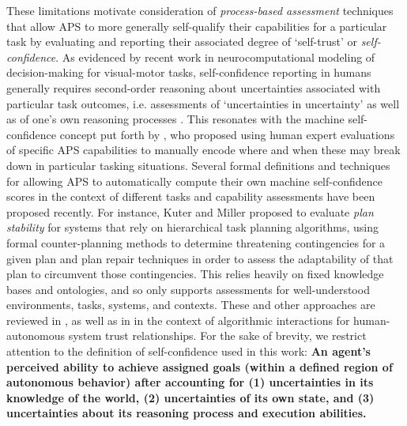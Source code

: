 These limitations motivate consideration of \emph{process-based assessment} techniques that allow APS to more generally self-qualify their capabilities for a particular task by evaluating and reporting their associated degree of `self-trust' or \emph{self-confidence}. 
As evidenced by recent work in neurocomputational modeling of decision-making for visual-motor tasks,
self-confidence reporting in humans generally requires second-order reasoning about uncertainties associated with particular task outcomes, i.e. assessments of `uncertainties in uncertainty' as well as of one's own reasoning processes \cite{Adler2016-oi}.  This resonates with the machine self-confidence concept put forth by \cite{Hutchins2015-if}, who proposed using human expert evaluations of specific APS capabilities to manually encode where and when these may break down in particular tasking situations. 
Several formal definitions and techniques for allowing APS to automatically compute their own machine self-confidence scores in the context of different tasks and capability assessments have been proposed recently.
For instance, Kuter and Miller \cite{Kuter2015-qh} proposed to evaluate \emph{plan stability} for systems that rely on hierarchical task planning algorithms, using formal counter-planning methods to determine threatening contingencies for a given plan and plan repair techniques in order to assess the adaptability of that plan to circumvent those contingencies. 
This relies heavily on fixed knowledge bases and ontologies, and so only supports assessments for well-understood environments, tasks, systems, and contexts. 
These and other approaches are reviewed in \cite{Sweet2016-tz}, as well as in \cite{Israelsen2017-ym} in the context of algorithmic interactions for human-autonomous system trust relationships. %
For the sake of brevity, we restrict attention to the definition of self-confidence used in this work: \textbf{An agent's perceived ability to achieve assigned goals (within a defined region of autonomous behavior) after accounting for (1) uncertainties in its knowledge of the world, (2) uncertainties of its own state, and (3) uncertainties about its reasoning process and execution abilities.}

